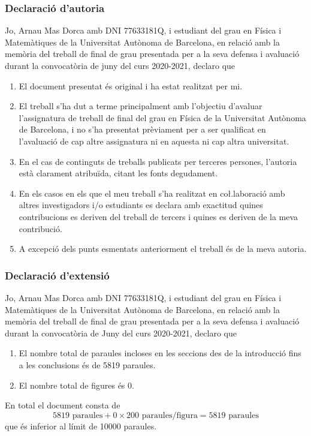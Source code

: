 \thispagestyle{empty}
\begin{otherlanguage}{catalan}
\subsubsection{Declaració d'autoria}
{ \sffamily Jo, Arnau Mas Dorca amb DNI 77633181Q, i estudiant del grau en Física i
	Matemàtiques de la Universitat Autònoma de Barcelona, en relació amb la memòria del
	treball de final de grau presentada per a la seva defensa i avaluació durant la
	convocatòria de juny del curs 2020-2021, declaro que
\begin{enumerate}
	\item El document presentat és original i ha estat realitzat per mi.
	\item El treball s'ha dut a terme principalment amb l'objectiu d'avaluar l'assignatura
		de treball de final del grau en Física de la Universitat Autònoma de Barcelona, i no
		s'ha presentat prèviament per a ser qualificat en l'avaluació de cap altre assignatura
		ni en aquesta ni cap altra universitat.
	\item En el cas de continguts de treballs publicats per terceres persones, l'autoria
		està clarament atribuïda, citant les fonts degudament.
	\item En els casos en els que el meu treball s'ha realitzat en co\l.laboració amb altres
		investigadors i/o estudiants es declara amb exactitud quines contribucions es deriven
		del treball de tercers i quines es deriven de la meva contribució. 
	\item A excepció dels punts esmentats anteriorment el treball és de la meva autoria. 
\end{enumerate}

}

\clearpage
\thispagestyle{empty}
\subsubsection{Declaració d'extensió}
{ \sffamily Jo, Arnau Mas Dorca amb DNI 77633181Q, i estudiant del grau en Física i
	Matemàtiques de la Universitat Autònoma de Barcelona, en relació amb la memòria del
	treball de final de grau presentada per a la seva defensa i avaluació durant la
	convocatòria de Juny del curs 2020-2021, declaro que
\begin{enumerate}
	\item El nombre total de paraules incloses en les seccions des de la introducció fins a
		les conclusions és de \num{5819} paraules. 
	\item El nombre total de figures és 0.
\end{enumerate}
En total el document consta de
\begin{equation*}
	\num{5819}\text{ paraules} + \num{0} \times \num{200}\text{ paraules/figura} =
	\num{5819}\text{ paraules}
\end{equation*}
que és inferior al límit de \num{10000} paraules. 

}
\end{otherlanguage}
